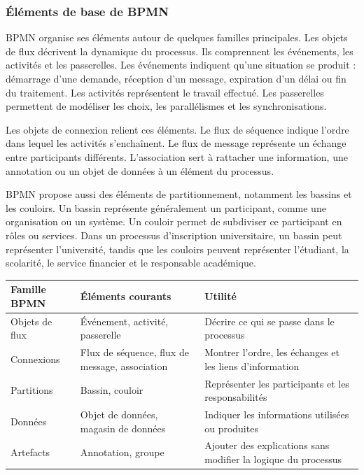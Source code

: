 \subsubsection{Éléments de base de BPMN}

BPMN organise ses éléments autour de quelques familles principales. Les objets de flux décrivent la dynamique du processus. Ils comprennent les événements, les activités et les passerelles. Les événements indiquent qu'une situation se produit : démarrage d'une demande, réception d'un message, expiration d'un délai ou fin du traitement. Les activités représentent le travail effectué. Les passerelles permettent de modéliser les choix, les parallélismes et les synchronisations.

Les objets de connexion relient ces éléments. Le flux de séquence indique l'ordre dans lequel les activités s'enchaînent. Le flux de message représente un échange entre participants différents. L'association sert à rattacher une information, une annotation ou un objet de données à un élément du processus.

BPMN propose aussi des éléments de partitionnement, notamment les bassins et les couloirs. Un bassin représente généralement un participant, comme une organisation ou un système. Un couloir permet de subdiviser ce participant en rôles ou services. Dans un processus d'inscription universitaire, un bassin peut représenter l'université, tandis que les couloirs peuvent représenter l'étudiant, la scolarité, le service financier et le responsable académique.

\begin{center}
\begin{tabular}{|p{3.5cm}|p{4.2cm}|p{6.8cm}|}
\hline
\textbf{Famille BPMN} & \textbf{Éléments courants} & \textbf{Utilité} \\
\hline
Objets de flux & Événement, activité, passerelle & Décrire ce qui se passe dans le processus \\
\hline
Connexions & Flux de séquence, flux de message, association & Montrer l'ordre, les échanges et les liens d'information \\
\hline
Partitions & Bassin, couloir & Représenter les participants et les responsabilités \\
\hline
Données & Objet de données, magasin de données & Indiquer les informations utilisées ou produites \\
\hline
Artefacts & Annotation, groupe & Ajouter des explications sans modifier la logique du processus \\
\hline
\end{tabular}
\end{center}

